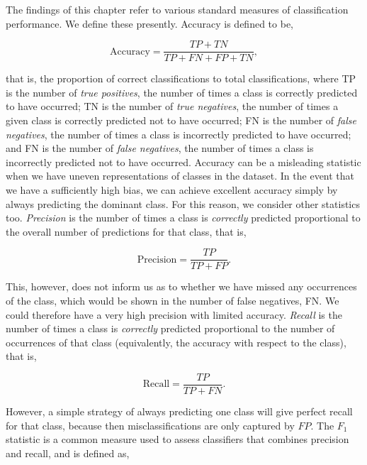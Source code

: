 The findings of this chapter refer to various standard measures of classification performance. We define these presently. Accuracy is defined to be,

\begin{equation}
\text{Accuracy} = \frac{TP + TN}{TP + FN + FP + TN},
\label{eq:accuracy}
\end{equation}

that is, the proportion of correct classifications to total classifications, where TP is the number of \emph{true positives}, the number of times a class is correctly predicted to have occurred; TN is the number of \emph{true negatives}, the number of times a given class is correctly predicted not to have occurred; FN is the number of \emph{false negatives}, the number of times a class is incorrectly predicted to have occurred; and FN is the number of \emph{false negatives}, the number of times a class is incorrectly predicted not to have occurred. Accuracy can be a misleading statistic when we have uneven representations of classes in the dataset. In the event that we have a sufficiently high bias, we can achieve excellent accuracy simply by always predicting the dominant class. For this reason, we consider other statistics too. \emph{Precision} is the number of times a class is \emph{correctly} predicted proportional to the overall number of predictions for that class, that is,

\begin{equation}
\text{Precision} = \frac{TP}{TP + FP}.
\label{eq:precision}
\end{equation}

This, however, does not inform us as to whether we have missed any occurrences of the class, which would be shown in the number of false negatives, FN. We could therefore have a very high precision with limited accuracy. \emph{Recall} is the number of times a class is \emph{correctly} predicted proportional to the number of occurrences of that class (equivalently, the accuracy with respect to the class), that is,

\begin{equation}
\text{Recall} = \frac{TP}{TP + FN}.
\label{eq:recall}
\end{equation}

However, a simple strategy of always predicting one class will give perfect recall for that class, because then misclassifications are only captured by $FP$. The $F_1$ statistic is a common measure used to assess classifiers that combines precision and recall, and is defined as,


